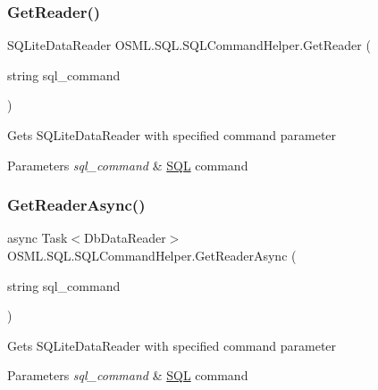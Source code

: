 \subsubsection{\texorpdfstring{GetReader()}{GetReader()}}
{\footnotesize\ttfamily S\+Q\+Lite\+Data\+Reader O\+S\+M\+L.\+S\+Q\+L.\+S\+Q\+L\+Command\+Helper.\+Get\+Reader (\begin{DoxyParamCaption}\item[{string}]{sql\+\_\+command }\end{DoxyParamCaption})\hspace{0.3cm}{\ttfamily [inline]}}



Gets S\+Q\+Lite\+Data\+Reader with specified command parameter 


\begin{DoxyParams}{Parameters}
{\em sql\+\_\+command} & \mbox{\hyperlink{namespaceOSML_1_1SQL}{S\+QL}} command\\
\hline
\end{DoxyParams}
\mbox{\label{classOSML_1_1SQL_1_1SQLCommandHelper_a356b592db2703b8061a7128de02b18a8}} 
\subsubsection{\texorpdfstring{GetReaderAsync()}{GetReaderAsync()}}
{\footnotesize\ttfamily async Task$<$Db\+Data\+Reader$>$ O\+S\+M\+L.\+S\+Q\+L.\+S\+Q\+L\+Command\+Helper.\+Get\+Reader\+Async (\begin{DoxyParamCaption}\item[{string}]{sql\+\_\+command }\end{DoxyParamCaption})\hspace{0.3cm}{\ttfamily [inline]}}



Gets S\+Q\+Lite\+Data\+Reader with specified command parameter 


\begin{DoxyParams}{Parameters}
{\em sql\+\_\+command} & \mbox{\hyperlink{namespaceOSML_1_1SQL}{S\+QL}} command\\
\hline
\end{DoxyParams}
\mbox{\label{classOSML_1_1SQL_1_1SQLCommandHelper_a8a951367810d4216a8ea2c38cc5cf4ac}} 
